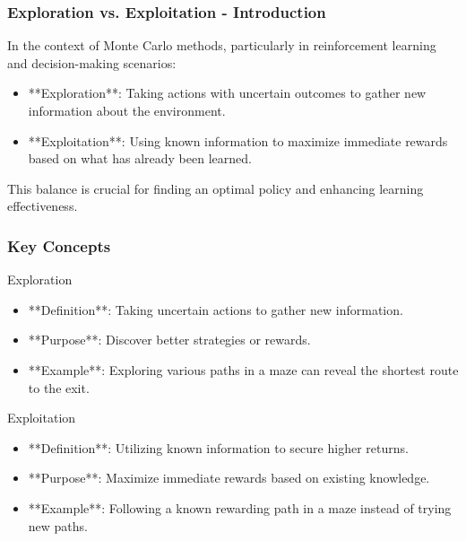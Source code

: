 \documentclass[aspectratio=169]{beamer}
\begin{document}
\begin{frame}[fragile]
    \frametitle{Exploration vs. Exploitation - Introduction}
    In the context of Monte Carlo methods, particularly in reinforcement learning and decision-making scenarios:
    \begin{itemize}
        \item **Exploration**: Taking actions with uncertain outcomes to gather new information about the environment.
        \item **Exploitation**: Using known information to maximize immediate rewards based on what has already been learned.
    \end{itemize}
    This balance is crucial for finding an optimal policy and enhancing learning effectiveness.
\end{frame}

\begin{frame}[fragile]
    \frametitle{Key Concepts}
    \begin{block}{Exploration}
        \begin{itemize}
            \item **Definition**: Taking uncertain actions to gather new information.
            \item **Purpose**: Discover better strategies or rewards.
            \item **Example**: Exploring various paths in a maze can reveal the shortest route to the exit.
        \end{itemize}
    \end{block}

    \begin{block}{Exploitation}
        \begin{itemize}
            \item **Definition**: Utilizing known information to secure higher returns.
            \item **Purpose**: Maximize immediate rewards based on existing knowledge.
            \item **Example**: Following a known rewarding path in a maze instead of trying new paths.
        \end{itemize}
    \end{block}
\end{frame}
\end{document}
